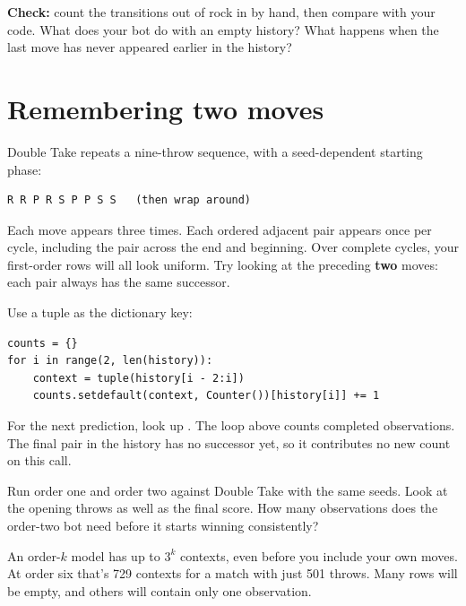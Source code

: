 \documentclass[11pt]{article}
\begin{document}
\begin{checkpoint}
\textbf{Check:} count the transitions out of rock in  by hand, then compare with your code. What does your bot do with an empty history? What happens when the last move has never appeared earlier in the history?
\end{checkpoint}
\clearpage
\section*{Remembering two moves}

\begin{context}
Double Take repeats a nine-throw sequence, with a seed-dependent starting phase:

\end{context}

\begin{lstlisting}[style=plaincode,numbers=none,xleftmargin=4pt,framexleftmargin=0pt]
R R P R S P P S S   (then wrap around)
\end{lstlisting}

Each move appears three times. Each ordered adjacent pair appears once per cycle, including the pair across the end and beginning. Over complete cycles, your first-order rows will all look uniform. Try looking at the preceding \textbf{two} moves: each pair always has the same successor.



Use a tuple as the dictionary key:


\begin{lstlisting}[style=python]
counts = {}
for i in range(2, len(history)):
    context = tuple(history[i - 2:i])
    counts.setdefault(context, Counter())[history[i]] += 1
\end{lstlisting}

For the next prediction, look up . The loop above counts completed observations. The final pair in the history has no successor yet, so it contributes no new count on this call.


Run order one and order two against Double Take with the same seeds. Look at the opening throws as well as the final score. How many observations does the order-two bot need before it starts winning consistently?



An order-$k$ model has up to $3^k$ contexts, even before you include your own moves. At order six that's 729 contexts for a match with just 501 throws. Many rows will be empty, and others will contain only one observation.
\end{document}
